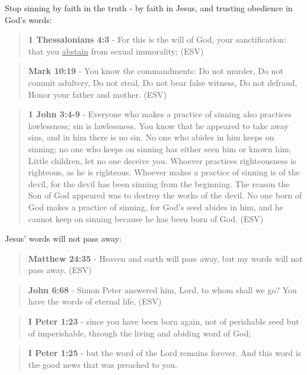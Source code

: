 \documentclass[11pt]{article}
\begin{document}
Stop sinning by faith in the truth - by faith in Jesus, and trusting obedience in God's words:

\begin{quote}
\textbf{1 Thessalonians 4:3} -  For this is the will of God, your sanctification: that you \uline{abstain} from sexual immorality;  (ESV)
\end{quote}

\begin{quote}
\textbf{Mark 10:19} - You know the commandments: Do not murder, Do not commit adultery, Do not steal, Do not bear false witness, Do not defraud, Honor your father and mother. (ESV)
\end{quote}

\begin{quote}
\textbf{1 John 3:4-9} - Everyone who makes a practice of sinning also practices lawlessness; sin is lawlessness.  You know that he appeared to take away sins, and in him there is no sin.  No one who abides in him keeps on sinning; no one who keeps on sinning has either seen him or known him.  Little children, let no one deceive you.  Whoever practices righteousness is righteous, as he is righteous.  Whoever makes a practice of sinning is of the devil, for the devil has been sinning from the beginning.  The reason the Son of God appeared was to destroy the works of the devil.  No one born of God makes a practice of sinning, for God's seed abides in him, and he cannot keep on sinning because he has been born of God.  (ESV)
\end{quote}

Jesus' words will not pass away:

\begin{quote}
\textbf{Matthew 24:35} - Heaven and earth will pass away, but my words will not pass away.  (ESV)
\end{quote}

\begin{quote}
\textbf{John 6:68} -  Simon Peter answered him, Lord, to whom shall we go?  You have the words of eternal life,  (ESV)
\end{quote}

\begin{quote}
\textbf{I Peter 1:23} - since you have been born again, not of perishable seed but of imperishable, through the living and abiding word of God;
\end{quote}

\begin{quote}
\textbf{I Peter 1:25} - but the word of the Lord remains forever. And this word is the good news that was preached to you.
\end{quote}
\end{document}
